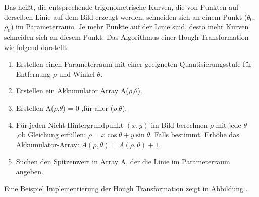 Das heißt, die entsprechende trigonometrische Kurven, die von Punkten auf derselben Linie auf dem Bild erzeugt werden, schneiden sich an einem Punkt ($ \theta_0 $, $ \rho_0 $) im Parameterraum. Je mehr Punkte auf der Linie sind, desto mehr Kurven schneiden sich an diesem Punkt. Das Algorithmus einer Hough Transformation wie folgend darstellt:

\begin{enumerate}
\item Erstellen einen Parameterraum mit einer geeigneten Quantisierungsstufe für Entfernung $ \rho $ und Winkel $ \theta $.
\item Erstellen ein Akkumulator Array A($ \rho $,$ \theta $).
\item Erstellen A($ \rho $,$ \theta $) = 0 ,für aller ($ \rho $,$ \theta $).
\item Für jeden Nicht-Hintergrundpunkt $ (x,y) $ im Bild berechnen $ \rho $ mit jede $ \theta $ ,ob Gleichung erfüllen: $ \rho = x \cos \theta + y \sin \theta $. Falls bestimmt, Erhöhe das Akkumulator-Array: $ A(\rho,\theta) = A(\rho,\theta) + 1 $.
\item Suchen den Spitzenwert in Array A, der die Linie im Parameterraum angeben.
\end{enumerate}

Eine Beispiel Implementierung der Hough Transformation zeigt in Abbildung .





